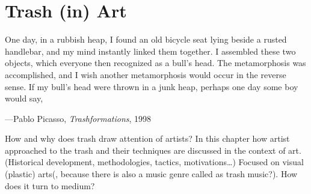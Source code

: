\chapter{Trash (in) Art}


\epigraph{One day, in a rubbish heap, I found an old bicycle seat lying beside a rusted handlebar, and my mind instantly linked them together. I assembled these two objects, which everyone then recognized as a bull’s head. The metamorphosis was accomplished, and I wish another metamorphosis would occur in the reverse sense. If my bull’s head were thrown in a junk heap, perhaps one day some boy would say, }{\hfill ---Pablo Picasso, \textit{Trashformations}, 1998}






How and why does trash draw attention of artists? In this chapter how artist approached to the trash and their techniques are discussed in the context of art. (Historical development, methodologies, tactics, motivations\ldots) Focused on visual (plastic) arts(, because there is also a music genre called as trash music?). How does it turn to medium?






%
%
